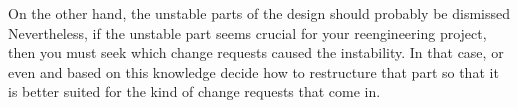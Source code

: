\documentclass[a4paper,10pt,twoside]{book}
\begin{document}
On the other hand, the unstable parts of the design should probably be dismissed Nevertheless, if the unstable part seems crucial for your reengineering project, then you must seek which change requests caused the instability. In that case,  or even  and based on this knowledge decide how to restructure that part so that it is better suited for the kind of change requests that come in.

\ifx\wholebook\relax\else
   
   
   
\end{document}
